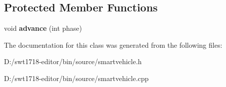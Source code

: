 \subsection*{Protected Member Functions}
\begin{DoxyCompactItemize}
\item 
\mbox{\label{class_smart_vehicle_a4f210dfd0c2cd4d6a009bea627b978df}} 
void {\bfseries advance} (int phase)
\end{DoxyCompactItemize}


The documentation for this class was generated from the following files\+:\begin{DoxyCompactItemize}
\item 
D\+:/swt1718-\/editor/bin/source/smartvehicle.\+h\item 
D\+:/swt1718-\/editor/bin/source/smartvehicle.\+cpp\end{DoxyCompactItemize}
